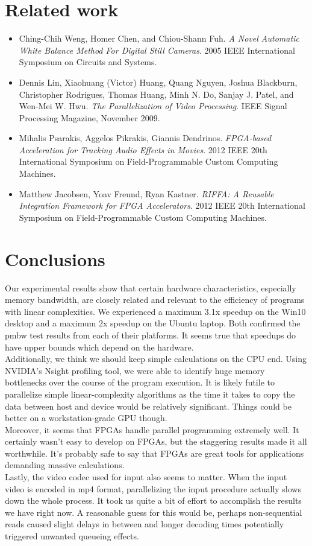 \documentclass{acm_proc_article-sp}
\begin{document}
\section{Related work}
\begin{itemize}
\item Ching-Chih Weng, Homer Chen, and Chiou-Shann Fuh. \textit{A Novel Automatic White Balance Method For Digital Still Cameras}. 2005 IEEE International Symposium on Circuits and Systems.
\item Dennis Lin, Xiaohuang (Victor) Huang, Quang Nguyen, Joshua Blackburn, Christopher Rodrigues, Thomas Huang, Minh N. Do, Sanjay J. Patel, and Wen-Mei W. Hwu. \textit{The Parallelization of Video Processing}. IEEE Signal Processing Magazine, November 2009.
\item Mihalis Psarakis, Aggelos Pikrakis, Giannis Dendrinos. \textit{FPGA-based Acceleration for Tracking Audio Effects in Movies}. 2012 IEEE 20th International Symposium on Field-Programmable Custom Computing Machines.
\item Matthew Jacobsen, Yoav Freund, Ryan Kastner. \textit{RIFFA: A Reusable Integration Framework for FPGA Accelerators}. 2012 IEEE 20th International Symposium on Field-Programmable Custom Computing Machines.
\end{itemize}

\section{Conclusions}
Our experimental results show that certain hardware characteristics, especially memory bandwidth, are closely related and relevant to the efficiency of programs with linear complexities. We experienced a maximum 3.1x speedup on the Win10 desktop and a maximum 2x speedup on the Ubuntu laptop. Both confirmed the pmbw test results from each of their platforms. It seems true that speedups do have upper bounds which depend on the hardware. \\
Additionally, we think we should keep simple calculations on the CPU end. Using NVIDIA's Nsight profiling tool, we were able to identify huge memory bottlenecks over the course of the program execution. It is likely futile to parallelize simple linear-complexity algorithms as the time it takes to copy the data between host and device would be relatively significant. Things could be better on a workstation-grade GPU though. \\
Moreover, it seems that FPGAs handle parallel programming extremely well. It certainly wasn't easy to develop on FPGAs, but the staggering results made it all worthwhile. It's probably safe to say that FPGAs are great tools for applications demanding massive calculations. \\
Lastly, the video codec used for input also seems to matter. When the input video is encoded in mp4 format, parallelizing the input procedure actually slows down the whole process. It took us quite a bit of effort to accomplish the results we have right now. A reasonable guess for this would be, perhaps non-sequential reads caused slight delays in between and longer decoding times potentially triggered unwanted queueing effects.
\end{document}
